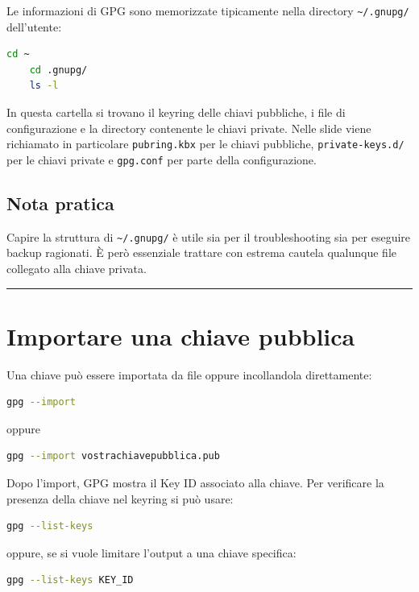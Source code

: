 \documentclass[12pt, a4paper]{report}
\begin{document}
Le informazioni di GPG sono memorizzate tipicamente nella directory \texttt{\~{}/.gnupg/} dell'utente:

\begin{lstlisting}[language=bash]
	cd ~
	cd .gnupg/
	ls -l
\end{lstlisting}

In questa cartella si trovano il keyring delle chiavi pubbliche, i file di configurazione e la directory contenente le chiavi private. Nelle slide viene richiamato in particolare \texttt{pubring.kbx} per le chiavi pubbliche, \texttt{private-keys.d/} per le chiavi private e \texttt{gpg.conf} per parte della configurazione.

\subsection{Nota pratica}
Capire la struttura di \texttt{\~{}/.gnupg/} è utile sia per il troubleshooting sia per eseguire backup ragionati. È però essenziale trattare con estrema cautela qualunque file collegato alla chiave privata.

\noindent\rule{\textwidth}{0.4pt}

\section{Importare una chiave pubblica}

Una chiave può essere importata da file oppure incollandola direttamente:

\begin{lstlisting}[language=bash]
	gpg --import
\end{lstlisting}

oppure

\begin{lstlisting}[language=bash]
	gpg --import vostrachiavepubblica.pub
\end{lstlisting}

Dopo l'import, GPG mostra il Key ID associato alla chiave. Per verificare la presenza della chiave nel keyring si può usare:

\begin{lstlisting}[language=bash]
	gpg --list-keys
\end{lstlisting}

oppure, se si vuole limitare l'output a una chiave specifica:

\begin{lstlisting}[language=bash]
	gpg --list-keys KEY_ID
\end{lstlisting}
\end{document}
